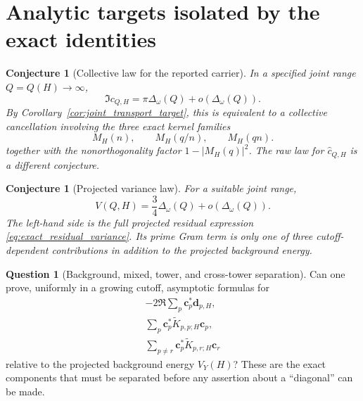 \documentclass[11pt]{amsart}
\numberwithin{equation}{section}
\theoremstyle{plain}
\newtheorem{conjecture}[theorem]{Conjecture}
\theoremstyle{definition}
\newtheorem{question}[theorem]{Question}
\theoremstyle{remark}
\newcommand{\1}{\mathbf{1}}
\begin{document}
\section{Analytic targets isolated by the exact identities}
\label{sec:analytic_targets}

\begin{conjecture}[Collective law for the reported carrier]
\label{conj:collective_carrier_law}
In a specified joint range \(Q=Q(H)\to\infty\),
\begin{equation}
\Im c_{Q,H}
=
\pi\Delta_\omega(Q)
+
o\left(\Delta_\omega(Q)\right).
\label{eq:collective_carrier_law}
\end{equation}
By Corollary~\ref{cor:joint_transport_target}, this is equivalent to a
collective cancellation involving the three exact kernel families
\begin{equation}
M_H(n),\qquad M_H(q/n),\qquad M_H(qn).
\label{eq:three_joint_kernel_families}
\end{equation}
together with the nonorthogonality factor
\(1-|M_H(q)|^2\).  The raw law for \(\widehat c_{Q,H}\) is a different
conjecture.
\end{conjecture}

\begin{conjecture}[Projected variance law]
\label{conj:projected_variance_law}
For a suitable joint range,
\begin{equation}
V(Q,H)
=
\frac34\Delta_\omega(Q)
+
o\left(\Delta_\omega(Q)\right).
\label{eq:projected_variance_law}
\end{equation}
The left-hand side is the full projected residual expression
\eqref{eq:exact_residual_variance}.  Its prime Gram term is only one of
three cutoff-dependent contributions in addition to the projected
background energy.
\end{conjecture}

\begin{question}[Background, mixed, tower, and cross-tower separation]
\label{question:tower_cross_tower_separation}
Can one prove, uniformly in a growing cutoff, asymptotic formulas for
\begin{align}
-2\Re\sum_p\mathbf c_p^\ast\mathbf d_{p,H},
\label{eq:mixed_sum_target}
\\
\sum_p\mathbf c_p^\ast\widetilde K_{p,p;H}\mathbf c_p,
\label{eq:tower_sum_target}
\\
\sum_{p\neq r}\mathbf c_p^\ast\widetilde K_{p,r;H}\mathbf c_r
\label{eq:cross_tower_sum_target}
\end{align}
relative to the projected background energy $V_Y(H)$?  These are the exact
components that must be separated before any assertion about a
``diagonal'' can be made.
\end{question}
\end{document}

